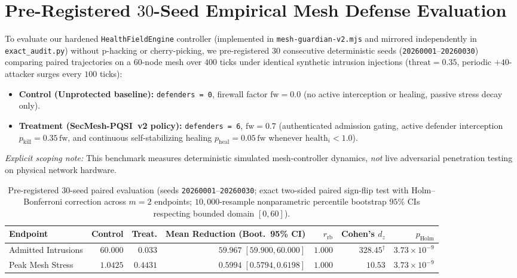 \documentclass[11pt,reqno]{amsart}
\newcommand{\code}[1]{\texttt{\small #1}}
\begin{document}
\section{Pre-Registered \texorpdfstring{$30$}{30}-Seed Empirical Mesh Defense Evaluation}
\label{sec:empirical}

To evaluate our hardened \code{HealthFieldEngine} controller (implemented in \code{mesh-guardian-v2.mjs} and mirrored independently in \code{exact\_audit.py}) without p-hacking or cherry-picking, we pre-registered $30$ consecutive deterministic seeds (\code{20260001}--\code{20260030}) comparing paired trajectories on a $60$-node mesh over $400$ ticks under identical synthetic intrusion injections ($\mathrm{threat}=0.35$, periodic $+40$-attacker surges every $100$ ticks):
\begin{itemize}[leftmargin=1.6em]
  \item \textbf{Control (Unprotected baseline):} \code{defenders = 0}, firewall factor $\mathrm{fw} = 0.0$ (no active interception or healing, passive stress decay only).
  \item \textbf{Treatment (SecMesh-PQSI~v2 policy):} \code{defenders = 6}, $\mathrm{fw} = 0.7$ (authenticated admission gating, active defender interception $p_{\mathrm{kill}} = 0.35\,\mathrm{fw}$, and continuous self-stabilizing healing $p_{\mathrm{heal}} = 0.05\,\mathrm{fw}$ whenever $\mathrm{health}_i < 1.0$).
\end{itemize}
\emph{Explicit scoping note:} This benchmark measures deterministic simulated mesh-controller dynamics, \emph{not} live adversarial penetration testing on physical network hardware.

\begin{table}[t]
\centering
\caption{Pre-registered $30$-seed paired evaluation (seeds \code{20260001}--\code{20260030}; exact two-sided paired sign-flip test with Holm--Bonferroni correction across $m=2$ endpoints; $10{,}000$-resample nonparametric percentile bootstrap $95\%$ CIs respecting bounded domain $[0,60]$).}
\label{tab:empirical}
\footnotesize
\setlength{\tabcolsep}{3.5pt}
\begin{tabular}{@{}l r r r r r r@{}}
\toprule
\textbf{Endpoint} & \textbf{Control} & \textbf{Treat.} & \textbf{Mean Reduction (Boot.\ 95\% CI)} & \textbf{$r_{\mathrm{rb}}$} & \textbf{Cohen's $d_z$} & \textbf{$p_{\mathrm{Holm}}$} \\
\midrule
Admitted Intrusions & $60.000$ & $0.033$ & $59.967\; [59.900, 60.000]$ & $1.000$ & $328.45^{\dagger}$ & $3.73 \times 10^{-9}$ \\
Peak Mesh Stress & $1.0425$ & $0.4431$ & $0.5994\; [0.5794, 0.6198]$ & $1.000$ & $10.53$ & $3.73 \times 10^{-9}$ \\
\bottomrule
\end{tabular}
\end{table}
\end{document}
